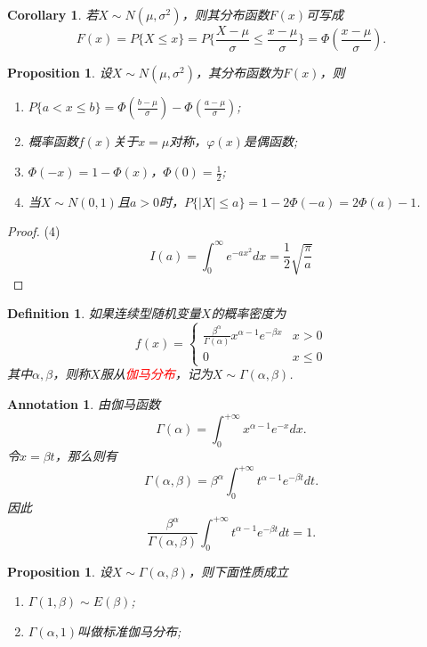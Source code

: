\documentclass{article}
\newtheorem{corollary}[theorem]{Corollary}
\newtheorem{proposition}[theorem]{Proposition}
\newtheorem{definition}[theorem]{Definition}
\newtheorem{annotation}[theorem]{Annotation}
\newcommand{\redt}[1]{\textcolor{red}{#1}}
\begin{document}
\begin{corollary}
\rm 若$X \sim N(\mu,\sigma^2)$，则其分布函数$F(x)$可写成
$$
F(x) = P\{X \leq x \} = P\{ \frac{X-\mu}{\sigma} \leq \frac{x-\mu}{\sigma} \} = \Phi(\frac{x-\mu}{\sigma}). 
$$
\end{corollary}

\begin{proposition}
\rm 设$X \sim N(\mu,\sigma^2)$，其分布函数为$F(x)$，则
\begin{enumerate}
	\item $P\{a < x \leq b\} = \Phi(\frac{b-\mu}{\sigma}) - \Phi(\frac{a-\mu}{\sigma})$;
	\item 概率函数$f(x)$关于$x=\mu$对称，$\varphi(x)$是偶函数;
	\item $\Phi(-x) = 1-\Phi(x)$，$\Phi(0) = \frac{1}{2}$;
	\item 当$X \sim N(0,1)$且$a > 0$时，$P\{|X| \leq a\} = 1-2\Phi(-a) = 2\Phi(a) - 1$. 
\end{enumerate}
\end{proposition}

\begin{proof}
{\color{red}(4)}
$$
I(a)=\int_0^{\infty}e^{-ax^2}dx =\frac12 \sqrt{\frac{\pi}{a}}
$$
\end{proof}

\begin{definition}
\rm 如果连续型随机变量$X$的概率密度为
$$
f(x) = \left\{ \begin{array}{ll}
\frac{\beta^\alpha}{\Gamma(\alpha)}x^{\alpha-1}e^{-\beta x} &  x > 0 \\
0 & x \leq 0 
\end{array} \right.
$$
其中$\alpha,\beta$，则称$X$服从\redt{伽马分布}，记为$X \sim \Gamma(\alpha,\beta)$.
\end{definition}

\begin{annotation}
\rm 由伽马函数
$$
\Gamma(\alpha) = \int_{0}^{+\infty} x^{\alpha-1}e^{-x}dx.
$$
令$x = \beta t$，那么则有
$$
\Gamma(\alpha,\beta) = \beta^\alpha \int_{0}^{+\infty} t^{\alpha-1} e^{-\beta t} dt. 
$$
因此
$$
\frac{\beta^\alpha}{\Gamma(\alpha,\beta)}\int_{0}^{+\infty} t^{\alpha-1} e^{-\beta t} dt = 1. 
$$
\end{annotation}

\begin{proposition}
\rm 设$X \sim \Gamma(\alpha,\beta)$，则下面性质成立
\begin{enumerate}
	\item $\Gamma(1,\beta) \sim E(\beta)$;
	\item $\Gamma(\alpha,1)$叫做标准伽马分布;
\end{enumerate}
\end{proposition}
\end{document}
